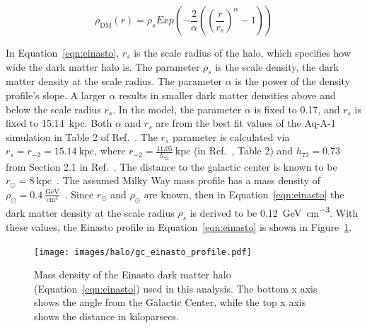     \begin{equation} \label{eqn:einasto}
      \rho_{\textrm{DM}} \left( r \right) = \rho_{s} Exp \left( - \frac{2}{\alpha} \left( {\left( \frac{r}{r_s} \right)}^{\alpha} - 1 \right) \right)
    \end{equation}
    
    
    In Equation~\ref{eqn:einasto}, $r_s$ is the scale radius of the halo, which specifies how wide the dark matter halo is.
    The parameter $\rho_s$ is the scale density, the dark matter density at the scale radius.
    The parameter $\alpha$ is the power of the density profile's slope.
    A larger $\alpha$ results in smaller dark matter densities above and below the scale radius $r_s$.
    In the model, the parameter $\alpha$ is fixed to 0.17, and $r_s$ is fixed to \SI{15.14}{kpc}.
    Both $\alpha$ and $r_s$ are from the best fit values of the Aq-A-1 simulation in Table 2 of Ref.~\cite{mw_halo_params}.
    The $r_s$ parameter is calculated via $r_s=r_{-2}=15.14\:\textrm{kpc}$, where $r_{-2}=\frac{11.05}{h_{73}}\:\textrm{kpc}$ (in Ref.~\cite{mw_halo_params}, Table 2) and $h_{73}=0.73$ from Section 2.1 in Ref.~\cite{mw_halo_params}.
    The distance to the galactic center is known to be $r_\odot=8\:\textrm{kpc}$~\cite{gc_distance_1,gc_distance_2,gc_distance_3}.
    The assumed Milky Way mass profile has a mass density of $\rho_\odot = 0.4\:\frac{\textrm{GeV}}{\textrm{cm}^3}$~\cite{local_dm_density,direct_dm_astrophysical_uncertainties}.
    Since $r_\odot$ and $\rho_\odot$ are known, then in Equation~\ref{eqn:einasto} the dark matter density at the scale radius $\rho_s$ is derived to be \SI{0.12}{\GeV\per\cm^3}.
    With these values, the Einasto profile in Equation~\ref{eqn:einasto} is shown in Figure~\ref{fig:gchalo_density}.
  
    \begin{figure}[ht]
      \centering
      \texttt{[image: images/halo/gc\_einasto\_profile.pdf]}
      \caption[Galactic Center Einasto Halo Density]{
        Mass density of the Einasto dark matter halo (Equation~\ref{eqn:einasto}) used in this analysis.
        The bottom x axis shows the angle from the Galactic Center, while the top x axis shows the distance in kiloparsecs.
        \CaptionBlankLine
        }
      \label{fig:gchalo_density}
    \end{figure}

